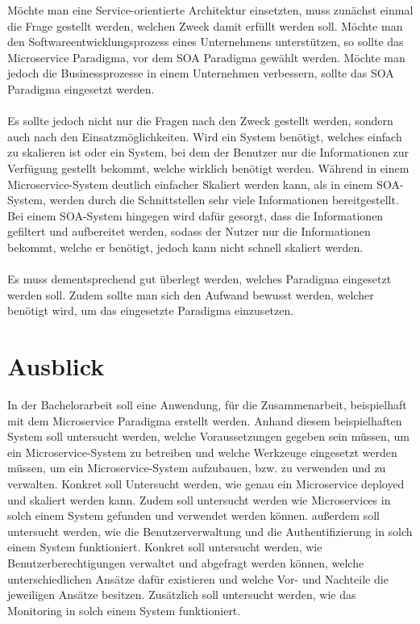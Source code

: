Möchte man eine Service-orientierte Architektur einsetzten, muss zunächst einmal die Frage gestellt werden, welchen Zweck damit erfüllt werden soll. Möchte man den Softwareentwicklungsprozess eines Unternehmens unterstützen, so sollte das Microservice Paradigma, vor dem SOA Paradigma  gewählt werden. Möchte man jedoch die Businessprozesse in einem Unternehmen verbessern, sollte das SOA Paradigma eingesetzt werden.
\\\\
Es sollte jedoch nicht nur die Fragen nach den Zweck gestellt werden, sondern auch nach den Einsatzmöglichkeiten. Wird ein System benötigt, welches einfach zu skalieren ist oder ein System, bei dem der Benutzer nur die Informationen zur Verfügung gestellt bekommt, welche wirklich benötigt werden. Während in einem Microservice-System deutlich einfacher Skaliert werden kann, als in einem SOA-System, werden durch die Schnittstellen sehr viele Informationen bereitgestellt. Bei einem SOA-System hingegen wird dafür gesorgt, dass die Informationen gefiltert und aufbereitet werden, sodass der Nutzer nur die Informationen bekommt, welche er benötigt, jedoch kann nicht schnell skaliert werden.
\\\\
Es muss dementsprechend gut überlegt werden, welches Paradigma eingesetzt werden soll. Zudem sollte man sich den Aufwand bewusst werden, welcher benötigt wird, um das eingesetzte Paradigma einzusetzen.

\section{Ausblick}
\label{sec:Ausblick}
In der Bachelorarbeit soll eine Anwendung, für die Zusammenarbeit, beispielhaft mit dem Microservice Paradigma erstellt werden. Anhand diesem beispielhaften System soll untersucht werden, welche Voraussetzungen gegeben sein müssen, um ein Microservice-System zu betreiben und welche Werkzeuge eingesetzt werden müssen, um ein Microservice-System aufzubauen, bzw. zu verwenden und zu verwalten. Konkret soll Untersucht werden, wie genau ein Microservice deployed und skaliert werden kann. Zudem soll untersucht werden wie Microservices in solch einem System gefunden und verwendet werden können. außerdem soll untersucht werden, wie die Benutzerverwaltung und die Authentifizierung in solch einem System funktioniert. Konkret soll untersucht werden, wie Benutzerberechtigungen verwaltet und abgefragt werden können, welche unterschiedlichen Ansätze dafür existieren und welche Vor- und Nachteile die jeweiligen Ansätze besitzen. Zusätzlich soll untersucht werden, wie das Monitoring in solch einem System funktioniert.